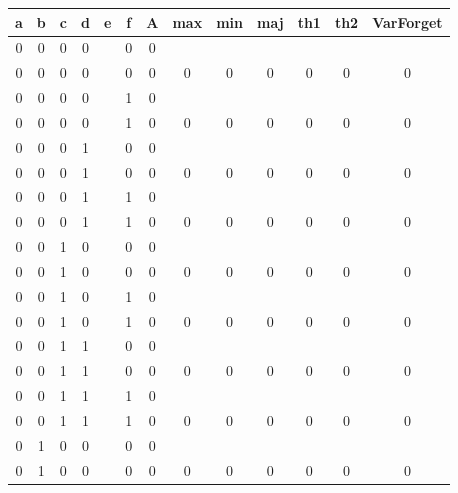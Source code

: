 \begin{table}[!tb]
    \centering
    \begin{tabular}{|c|c|c|c|c|c|c|c|c|c|c|c|c|}
        \hline
        \textbf{a} & \textbf{b} & \textbf{c} & \textbf{d} & \textbf{e} & \textbf{f} & \textbf{A} & \textbf{max} & \textbf{min} & \textbf{maj} & \textbf{th1} & \textbf{th2} & \textbf{VarForget} \\ \hline
        \rowcolor{gray!40} 0 & 0 & 0 & 0 &  & 0 & 0 &  &  &  &  &  &  \\ \hline
        \rowcolor{gray!40} 0 & 0 & 0 & 0 &  & 0 & 0 & 0 & 0 & 0 & 0 & 0 & 0 \\ \hline
        \rowcolor{blue!40} 0 & 0 & 0 & 0 &  & 1 & 0 &  &  &  &  &  &  \\ \hline
        \rowcolor{blue!40} 0 & 0 & 0 & 0 &  & 1 & 0 & 0 & 0 & 0 & 0 & 0 & 0 \\ \hline
        \rowcolor{red!40} 0 & 0 & 0 & 1 &  & 0 & 0 &  &  &  &  &  &  \\ \hline
        \rowcolor{red!40} 0 & 0 & 0 & 1 &  & 0 & 0 & 0 & 0 & 0 & 0 & 0 & 0 \\ \hline
        \rowcolor{green!40} 0 & 0 & 0 & 1 &  & 1 & 0 &  &  &  &  &  &  \\ \hline
        \rowcolor{green!40} 0 & 0 & 0 & 1 &  & 1 & 0 & 0 & 0 & 0 & 0 & 0 & 0 \\ \hline
        \rowcolor{yellow!40} 0 & 0 & 1 & 0 &  & 0 & 0 &  &  &  &  &  &  \\ \hline
        \rowcolor{yellow!40} 0 & 0 & 1 & 0 &  & 0 & 0 & 0 & 0 & 0 & 0 & 0 & 0 \\ \hline
        \rowcolor{gray!40} 0 & 0 & 1 & 0 &  & 1 & 0 &  &  &  &  &  &  \\ \hline
        \rowcolor{gray!40} 0 & 0 & 1 & 0 &  & 1 & 0 & 0 & 0 & 0 & 0 & 0 & 0 \\ \hline
        \rowcolor{blue!40} 0 & 0 & 1 & 1 &  & 0 & 0 &  &  &  &  &  &  \\ \hline
        \rowcolor{blue!40} 0 & 0 & 1 & 1 &  & 0 & 0 & 0 & 0 & 0 & 0 & 0 & 0 \\ \hline
        \rowcolor{red!40} 0 & 0 & 1 & 1 &  & 1 & 0 &  &  &  &  &  &  \\ \hline
        \rowcolor{red!40} 0 & 0 & 1 & 1 &  & 1 & 0 & 0 & 0 & 0 & 0 & 0 & 0 \\ \hline
        \rowcolor{green!40} 0 & 1 & 0 & 0 &  & 0 & 0 &  &  &  &  &  &  \\ \hline
        \rowcolor{green!40} 0 & 1 & 0 & 0 &  & 0 & 0 & 0 & 0 & 0 & 0 & 0 & 0 \\ \hline

\end{tabular}
\end{table}
